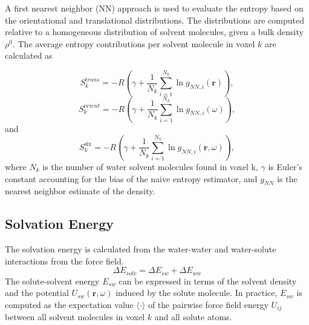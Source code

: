 \documentclass[9pt,tutorial]{livecoms}
\begin{document}
A first nearest neighbor (NN) approach is used to evaluate the entropy based on the orientational and translational distributions.
The distributions are computed relative to a homogeneous distribution of solvent molecules, given a bulk density $\rho^0$.
The average entropy contributions per solvent molecule in voxel $k$ are calculated as

\begin{equation}
	S_{k}^\textit{trans} = -R \left( \gamma + \frac{1}{N_\textit{k}} \sum _{i=1}^{N_k} \ln g_{NN, \textit{i}}(\textbf{r}) \right),
\end{equation}
\begin{equation}
S_{k}^\textit{orient} = -R \left( \gamma + \frac{1}{N_k} \sum _{i=1}^{N_k} \ln g_{NN, i}(\omega) \right)
,
\end{equation}
and
\begin{equation}
S_\textit{k}^\text{six} = -R \left( \gamma + \frac{1}{N_\textit{k}} \sum _{i=1}^{N_k} \ln g_{NN, \textit{i}}(\textbf{r},\omega) \right),
\end{equation}
where $N_\textit{k}$ is the number of water solvent molecules found in voxel k, $\gamma$ is Euler's constant accounting for the bias of the naive entropy estimator, and $g_\textit{NN}$ is the nearest neighbor estimate of the density.

\subsection{Solvation Energy}
The solvation energy is calculated from the water-water and water-solute interactions from the force field.
\begin{equation}
	\Delta E_\textit{solv} = \Delta E_\textit{sw} + \Delta E_\textit{ww}
\end{equation}
The solute-solvent energy $E_{sw}$ can be expressed in terms of the solvent density and the potential $U_{sw}(\textbf{r},\omega)$ induced by the solute molecule.
In practice, $E_{sw}$ is computed as the expectation value $\langle\cdot\rangle$ of the pairwise force field energy $U_{ij}$ between all solvent molecules in voxel $k$ and all solute atoms.
\end{document}
